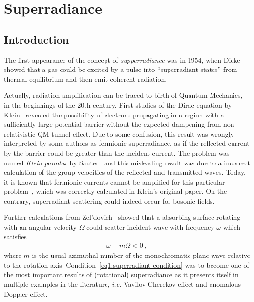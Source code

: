 
\chapter{Superradiance} %
\label{Chapter1} 


\section{Introduction}

The first appearance of the concept of \emph{supperradiance} was in 1954, when Dicke~\cite{Dicke1954} showed that a gas could be excited by a pulse into ``superradiant states'' from thermal equilibrium and then emit coherent radiation. 

Actually, radiation amplification can be traced to birth of Quantum Mechanics, in the beginnings of the 20th century. 
First studies of the Dirac equation by Klein~\cite{Klein1929} revealed the possibility of electrons propagating in a region with a sufficiently large potential barrier without the expected dampening from non-relativistic QM tunnel effect.
Due to some confusion, this result was wrongly interpreted by some authors as fermionic superradiance, as if the reflected current by the barrier could be greater than the incident current. 
The problem was named \emph{Klein paradox} by Sauter~\cite{Sauter1931} and this misleading result was due to a incorrect calculation of the group velocities of the reflected and transmitted waves. 
Today, it is known that fermionic currents cannot be amplified for this particular problem~\cite{Manogue1988, Brito2015}, which was correctly calculated in Klein's original paper. 
On the contrary, superradiant scattering could indeed occur for bosonic fields. 

Further calculations from Zel'dovich~\cite{Zeldovich1971,Zeldovich1972} showed that a absorbing surface rotating with an angular velocity $\Omega$ could scatter incident wave with frequency $\omega$ which satisfies
\begin{align}
    \omega - m \Omega < 0 ~,
    \label{eq:superradiant-condition}
\end{align}
where $m$ is the usual azimuthal number of the monochromatic plane wave relative to the rotation axis. 
Condition~\eqref{eq1:superradiant-condition} was to become one of the most important results of (rotational) superradiance as it presents itself in multiple examples in the literature, \emph{i.e.} Vavilov-Cherekov effect and anomalous Doppler effect.

